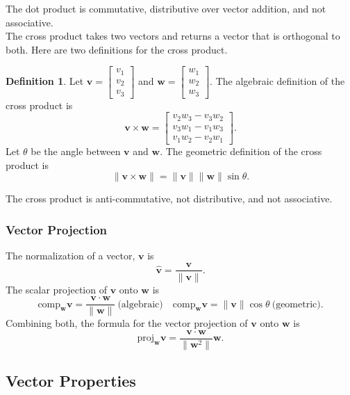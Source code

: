 \documentclass[11pt]{scrartcl}
\theoremstyle{plain}
\theoremstyle{definition}
\newtheorem*{definition}{Definition}
\theoremstyle{remark}
\begin{document}
The dot product is commutative, distributive over vector addition, and not associative. \\

The cross product takes two vectors and returns a vector that is orthogonal to both. Here are two definitions for 
the cross product.

\begin{definition}
    Let $\mathbf{v}=\begin{bmatrix}v_{1} \\ v_{2} \\ v_{3}\end{bmatrix}$ and $\mathbf{w}=\begin{bmatrix}w_{1} \\ 
    w_{2} \\ w_{3}\end{bmatrix}$. The algebraic definition of the cross product is
    \[ \mathbf{v}\times \mathbf{w}=\begin{bmatrix}v_{2}w_{3}-v_{3}w_{2} \\ v_{3}w_{1}-v_{1}w_{3} \\ 
    v_{1}w_{2}-v_{2}w_{1} \end{bmatrix}. \]
    Let $\theta$ be the angle between $\mathbf{v}$ and $\mathbf{w}$. The geometric definition of the cross product is 
    \[ \lVert \mathbf{v}\times \mathbf{w} \rVert=\lVert \mathbf{v} \rVert \lVert \mathbf{w} \rVert \sin \theta. \]
\end{definition}

The cross product is anti-commutative, not distributive, and not associative.

\subsubsection{Vector Projection}

The normalization of a vector, $\mathbf{v}$ is
\[ \hat{\mathbf{v}}=\frac{\mathbf{v}}{\lVert \mathbf{v} \rVert }. \]
The scalar projection of $\mathbf{v}$ onto $\mathbf{w}$ is 
\[ \text{comp}_{\mathbf{w}}\mathbf{v} = \frac{{\mathbf{v}\cdot \mathbf{w}}}{\lVert \mathbf{w} \rVert }\ 
\text{(algebraic)}\quad \text{comp}_{\mathbf{w}}\mathbf{v} = \lVert \mathbf{v} \rVert \cos \theta\ \text{(geometric)}.  \]
Combining both, the formula for the vector projection of $\mathbf{v}$ onto $\mathbf{w}$ is
\[ \text{proj}_{\mathbf{w}}\mathbf{v} = \frac{{\mathbf{v}\cdot \mathbf{w}}}{\lVert \mathbf{w}^{2} \rVert }\mathbf{w}. \]

\subsection{Vector Properties}
\end{document}
